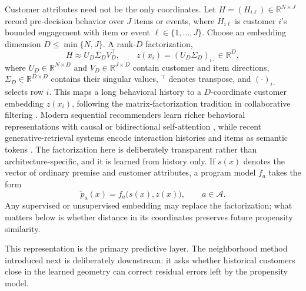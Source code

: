 \documentclass[11pt]{article}
\theoremstyle{noteplain}
\theoremstyle{definition}
\newcommand{\cA}{\mathcal A}
\begin{document}
Customer attributes need not be the only coordinates. Let $H=(H_{i\ell})\in\mathbb R^{N\times J}$ record pre-decision behavior over $J$ items or events, where $H_{i\ell}$ is customer $i$'s bounded engagement with item or event $\ell\in\{1,\ldots,J\}$. Choose an embedding dimension $D\leq\min\{N,J\}$. A rank-$D$ factorization,
\[
 H\approx U_D\Sigma_DV_D^\top,
 \qquad z(x_i)=(U_D\Sigma_D)_{i\cdot}\in\mathbb R^D,
\]
where $U_D\in\mathbb R^{N\times D}$ and $V_D\in\mathbb R^{J\times D}$ contain customer and item directions, $\Sigma_D\in\mathbb R^{D\times D}$ contains their singular values, ${}^\top$ denotes transpose, and $(\cdot)_{i\cdot}$ selects row $i$. This maps a long behavioral history to a $D$-coordinate customer embedding $z(x_i)$, following the matrix-factorization tradition in collaborative filtering \cite{koren}. Modern sequential recommenders learn richer behavioral representations with causal or bidirectional self-attention \cite{sasrec,bert4rec}, while recent generative-retrieval systems encode interaction histories and items as semantic tokens \cite{tiger}. The factorization here is deliberately transparent rather than architecture-specific, and it is learned from history only. If $s(x)$ denotes the vector of ordinary premise and customer attributes, a program model $f_a$ takes the form
\begin{equation}\label{eq:prop-model}
 \widetilde p_a(x)=f_a\bigl(s(x),z(x)\bigr),\qquad a\in\cA.
\end{equation}
Any supervised or unsupervised embedding may replace the factorization; what matters below is whether distance in its coordinates preserves future propensity similarity.

This representation is the primary predictive layer. The neighborhood method introduced next is deliberately downstream: it asks whether historical customers close in the learned geometry can correct residual errors left by the propensity model.
\end{document}
